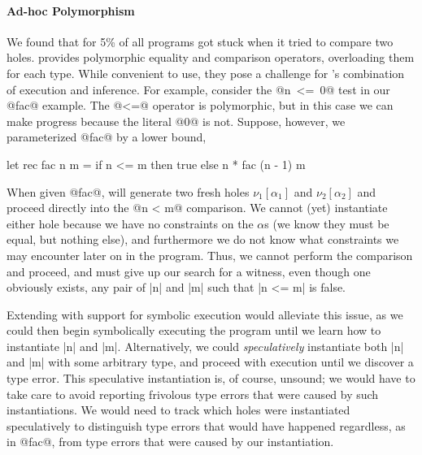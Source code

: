 \paragraph{Ad-hoc Polymorphism}
%
We found that for 5\% of all programs \toolname got stuck when it tried to
compare two holes.
%
\ocaml provides polymorphic equality and comparison operators,
overloading them for each type.
%
While convenient to use, they pose a challenge for \toolname's
combination of execution and inference.
%
For example, consider the \hbox{@n <= 0@} test in our @fac@ example.
%
The @<=@ operator is polymorphic, but in this case we can make progress because
the literal @0@ is not.
%
Suppose, however, we parameterized @fac@ by a lower bound, \eg
%
\begin{code}
  let rec fac n m =
    if n <= m then
      true
    else
      n * fac (n - 1) m
\end{code}
%
When given @fac@, \toolname will generate two fresh holes
$\nu_1[\alpha_1]$ and $\nu_2[\alpha_2]$ and proceed directly into the
@n < m@ comparison.
%
We cannot (yet) instantiate either hole because we have no constraints
on the $\alpha$s (we know they must be equal, but nothing else), and
furthermore we do not know what constraints we may encounter later on in
the program.
%
Thus, we cannot perform the comparison and proceed, and must give up our
search for a witness, even though one obviously exists, any pair of |n|
and |m| such that |n <= m| is false.

Extending \toolname with support for symbolic execution would alleviate
this issue, as we could then begin symbolically executing the program
until we learn how to instantiate |n| and |m|.
%
Alternatively, we could \emph{speculatively} instantiate both |n| and
|m| with some arbitrary type, and proceed with execution until we
discover a type error.
%
This speculative instantiation is, of course, unsound; we would have to
take care to avoid reporting frivolous type errors that were caused by
such instantiations.
%
We would need to track which holes were instantiated speculatively 
to distinguish type errors that would have happened regardless, as
in @fac@, from type errors that were caused by our instantiation.

